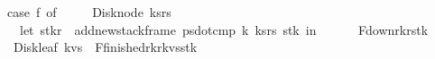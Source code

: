\begin{isabellebody}
\ \ \ \ case\ f\ of\ \isanewline
\ \ \ \ Disk{\isacharunderscore}node\ {\isacharparenleft}ks{\isacharcomma}rs{\isacharparenright}\ {\isasymRightarrow}\ {\isacharparenleft}\isanewline
\ \ \ \ \ \ let\ {\isacharparenleft}stk{\isacharprime}{\isacharcomma}r{\isacharprime}{\isacharparenright}\ {\isacharequal}\ add{\isacharunderscore}new{\isacharunderscore}stack{\isacharunderscore}frame\ {\isacharparenleft}ps{}{\isacharbar}{\isachargreater}dot{\isacharunderscore}cmp{\isacharparenright}\ k\ {\isacharparenleft}ks{\isacharcomma}rs{\isacharparenright}\ stk\ in\isanewline
\ \ \ \ \ \ F{\isacharunderscore}down{\isacharparenleft}r{}{\isacharcomma}k{\isacharcomma}r{\isacharprime}{\isacharcomma}stk{\isacharprime}{\isacharparenright}{\isacharparenright}\isanewline
\ \ \ \ {\isacharbar}\ Disk{\isacharunderscore}leaf\ kvs\ {\isasymRightarrow}\ {\isacharparenleft}F{\isacharunderscore}finished{\isacharparenleft}r{}{\isacharcomma}k{\isacharcomma}r{\isacharcomma}kvs{\isacharcomma}stk{\isacharparenright}{\isacharparenright}{\isacharparenright}{\isacharparenright}\ {\isacharparenright}{\isachardoublequoteclose}\isanewline
\isanewline
\isanewline
\isanewline
%
\isadelimtheory
\isanewline
%
\endisadelimtheory
%
\isatagtheory
{}\isamarkupfalse%
%
\endisatagtheory
{\isafoldtheory}%
%
\isadelimtheory
\isanewline
%
\endisadelimtheory
\isanewline
\isanewline
\isanewline
\isanewline
\isanewline
\isanewline
\isanewline
\isanewline
\isanewline
\isanewline
\end{isabellebody}%
